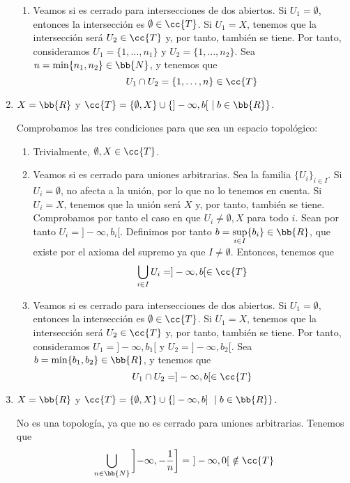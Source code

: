 \begin{ejercicio}
\begin{enumerate}[label=\alph*)]
\begin{enumerate}
            \item Veamos si es cerrado para intersecciones de dos abiertos. Si $U_1=\emptyset$, entonces la intersección es $\emptyset\in \cc{T}$. Si $U_1=X$, tenemos que la intersección será $U_2\in \cc{T}$ y, por tanto, también se tiene. Por tanto, consideramos $U_1=\{1,\dots,n_1\}$ y $U_2=\{1,\dots, n_2\}$. Sea $n=\min\{n_1, n_2\}\in \bb{N}$, y tenemos que
            $$U_1\cap U_2 = \{1,\dots, n\}\in \cc{T}$$
        \end{enumerate}

        \item $X=\bb{R}$ y $\cc{T}=\{\emptyset, X\}\cup \left\{]-\infty, b[~\mid b\in \bb{R}\right\}$.

        Comprobamos las tres condiciones para que sea un espacio topológico:
        \begin{enumerate}
            \item Trivialmente, $\emptyset, X\in \cc{T}$.
            \item Veamos si es cerrado para uniones arbitrarias. Sea la familia $\{U_i\}_{i\in I}$. Si $U_i=\emptyset$, no afecta a la unión, por lo que no lo tenemos en cuenta. Si $U_i=X$, tenemos que la unión será $X$ y, por tanto, también se tiene. Comprobamos por tanto el caso en que $U_i\neq \emptyset, X$ para todo $i$. Sean por tanto $U_i=]-\infty, b_i[$. Definimos por tanto $b=\sup\limits_{i\in I}\{b_i\}\in \bb{R}$, que existe por el axioma del supremo ya que $I\neq \emptyset$. Entonces, tenemos que
            $$\bigcup_{i\in I}U_i = ]-\infty,b[\in \cc{T}$$

            \item Veamos si es cerrado para intersecciones de dos abiertos. Si $U_1=\emptyset$, entonces la intersección es $\emptyset\in \cc{T}$. Si $U_1=X$, tenemos que la intersección será $U_2\in \cc{T}$ y, por tanto, también se tiene. Por tanto, consideramos $U_1=]-\infty, b_1[$ y $U_2=]-\infty, b_2[$. Sea $b=\min\{b_1, b_2\}\in \bb{R}$, y tenemos que
            $$U_1\cap U_2 = ]-\infty, b[\in \cc{T}$$
        \end{enumerate}

        \item $X=\bb{R}$ y $\cc{T}=\{\emptyset, X\}\cup \left\{]-\infty, b]~\mid  b\in \bb{R}\right\}$.

        No es una topología, ya que no es cerrado para uniones arbitrarias. Tenemos que
        $$\bigcup_{n\in \bb{N}}\left]-\infty, -\frac{1}{n}\right]=~]-\infty, 0[~\notin \cc{T}$$


\end{enumerate}
\end{ejercicio}
